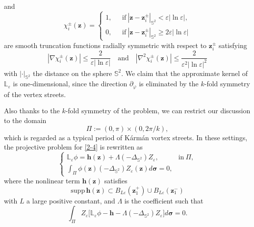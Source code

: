 \documentclass[12pt,reqno]{amsart}
\numberwithin{equation}{section}
\theoremstyle{definition}
\theoremstyle{remark}
\begin{document}
and 
\begin{equation*}
	\chi_i^\pm(\boldsymbol z)=\left\{
	\begin{array}{lll}
		1, \ \ \  & \mathrm{if} \ |\boldsymbol z-\boldsymbol z_i^\pm|_{\mathbb S^2}< \varepsilon|\ln\varepsilon|,\\
		0, & \mathrm{if} \ |\boldsymbol z-\boldsymbol z_i^\pm|_{\mathbb S^2}\ge 2\varepsilon|\ln\varepsilon|
	\end{array}
	\right.
\end{equation*}
are smooth truncation functions radially symmetric with respect to $\boldsymbol z_i^\pm$ satisfying
\begin{equation*}
	|\nabla \chi_i^\pm(\boldsymbol z)|\le \frac{2}{\varepsilon|\ln\varepsilon|} \quad \mathrm{and} \quad |\nabla^2 \chi_i^\pm(\boldsymbol z)|\le \frac{2}{\varepsilon^2|\ln\varepsilon|^2}
\end{equation*}
 with $|\cdot|_{\mathbb S^2}$ the distance on the sphere $\mathbb S^2$. We claim that the approximate kernel of $\mathbb L_\varepsilon$ is
 one-dimensional, since the direction $\partial_\varphi$ is eliminated by the $k$-fold symmetry of the vertex streets.

Also thanks to the $k$-fold symmetry of the problem, we can restrict our discussion to the domain 
\begin{equation*}
	\Pi:=(0,\pi)\times\left(0,2\pi/k\right),
\end{equation*}
which is regarded as a typical period of K\'arm\'an vortex streets. In these settings, the projective problem for \eqref{2-4} is rewritten as
\begin{equation}\label{2-6}
	   \begin{cases}
		\mathbb L_\varepsilon\phi=\mathbf h(\boldsymbol z)+\Lambda(-\Delta_{\mathbb S^2})Z_\varepsilon, \ \ &\text{in} \ \Pi,\\
		\int_{\Pi}  \phi(\boldsymbol z)(-\Delta_{\mathbb S^2})Z_\varepsilon(\boldsymbol z) d\boldsymbol \sigma=0,
	   \end{cases}
\end{equation}
where the nonlinear term $\mathbf h(\boldsymbol z)$ satisfies 
$$\mathrm{supp}\, \mathbf h(\boldsymbol z)\subset B_{L\varepsilon}(\boldsymbol z_1^+)\cup B_{L\varepsilon}(\boldsymbol z_1^-)$$
with $L$ a large positive constant, and $\Lambda$ is the coefficient such that 
\begin{equation*}
	\int_{\Pi}Z_\varepsilon\big[\mathbb L_\varepsilon\phi-\mathbf h-\Lambda (-\Delta_{\mathbb S^2})Z_\varepsilon\big]d\boldsymbol \sigma=0.
\end{equation*}
\end{document}
